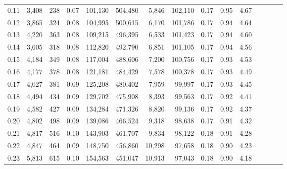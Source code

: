 \begin{tabular}{rrrcrrrrrrrrrrr}
0.11 &   3,408 &     238 &                                       0.07 &  101,130 &  504,480 &    5,846 &  102,110 &  0.17 &  0.95 &                         4.67 \\
0.12 &   3,865 &     324 &                                       0.08 &  104,995 &  500,615 &    6,170 &  101,786 &  0.17 &  0.94 &                         4.64 \\
0.13 &   4,220 &     363 &                                       0.08 &  109,215 &  496,395 &    6,533 &  101,423 &  0.17 &  0.94 &                         4.60 \\
0.14 &   3,605 &     318 &                                       0.08 &  112,820 &  492,790 &    6,851 &  101,105 &  0.17 &  0.94 &                         4.56 \\
0.15 &   4,184 &     349 &                                       0.08 &  117,004 &  488,606 &    7,200 &  100,756 &  0.17 &  0.93 &                         4.53 \\
0.16 &   4,177 &     378 &                                       0.08 &  121,181 &  484,429 &    7,578 &  100,378 &  0.17 &  0.93 &                         4.49 \\
0.17 &   4,027 &     381 &                                       0.09 &  125,208 &  480,402 &    7,959 &   99,997 &  0.17 &  0.93 &                         4.45 \\
0.18 &   4,494 &     434 &                                       0.09 &  129,702 &  475,908 &    8,393 &   99,563 &  0.17 &  0.92 &                         4.41 \\
0.19 &   4,582 &     427 &                                       0.09 &  134,284 &  471,326 &    8,820 &   99,136 &  0.17 &  0.92 &                         4.37 \\
0.20 &   4,802 &     498 &                                       0.09 &  139,086 &  466,524 &    9,318 &   98,638 &  0.17 &  0.91 &                         4.32 \\
0.21 &   4,817 &     516 &                                       0.10 &  143,903 &  461,707 &    9,834 &   98,122 &  0.18 &  0.91 &                         4.28 \\
0.22 &   4,847 &     464 &                                       0.09 &  148,750 &  456,860 &   10,298 &   97,658 &  0.18 &  0.90 &                         4.23 \\
0.23 &   5,813 &     615 &                                       0.10 &  154,563 &  451,047 &   10,913 &   97,043 &  0.18 &  0.90 &                         4.18 \\

\end{tabular}

